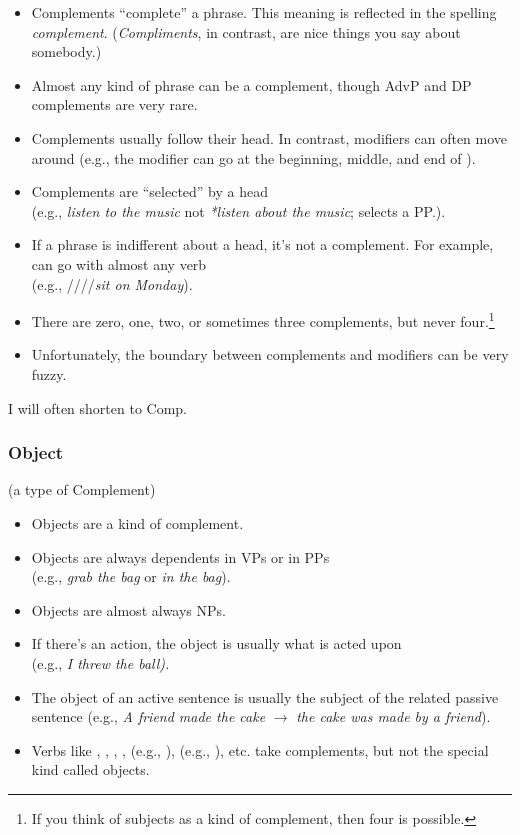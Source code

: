 \begin{itemize}[noitemsep]
    \item {}Complements ``complete'' a phrase. This meaning is reflected in the spelling \textit{compl\emph{e}ment}. (\textit{Compl\emph{i}ments}, in contrast, are nice things you say about somebody.)
    \item Almost any kind of phrase can be a complement, though AdvP and DP complements are very rare.
    \item Complements usually follow their head. In contrast, modifiers can often move around (e.g., the modifier  can go at the beginning, middle, and end of ).
    \item Complements are \enquote{selected} by a head \\(e.g., \textit{listen \emph{to the music}} not \textit{*listen \emph{about the music}};  selects a  PP.).
    \item If a phrase is indifferent about a head, it's not a complement. For example,  can go with almost any verb \\(e.g., ////\textit{sit \emph{on Monday}}).
    \item There are zero, one, two, or sometimes three complements, but never four.\footnote{If you think of subjects as a kind of complement, then four is possible.}
    \item Unfortunately, the boundary between complements and modifiers can be very fuzzy.
\end{itemize}

I will often shorten  to Comp.

\subsubsection{Object}\label{sec:object}
(a type of Complement)

\begin{itemize}[noitemsep]
    \item {}Objects are a kind of complement.
    \item Objects are always dependents in VPs or in PPs \\(e.g., \textit{grab \emph{the bag}} or \textit{in \emph{the bag}}).
    \item Objects are almost always NPs.
    \item If there's an action, the object is usually what is acted upon \\(e.g., \textit{I threw \emph{the ball}).}
    \item The object of an active sentence is usually the subject of the related passive sentence (e.g., \textit{A friend made \emph{the cake}} $\rightarrow$ \textit{\emph{the cake} was made by a friend}).
    \item Verbs like , , , ,  (e.g., ),  (e.g., ), etc. take complements, but not the special kind called objects.
\end{itemize}

